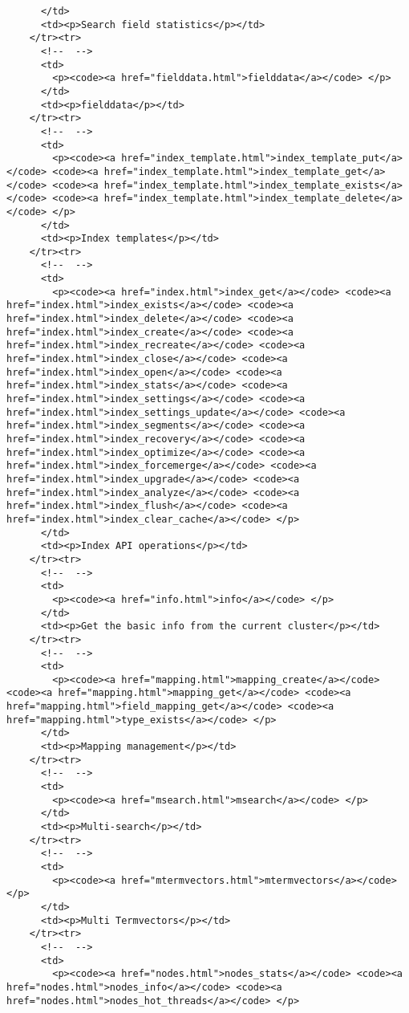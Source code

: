 \documentclass[]{article}
\begin{document}
\begin{verbatim}
      </td>
      <td><p>Search field statistics</p></td>
    </tr><tr>
      <!--  -->
      <td>
        <p><code><a href="fielddata.html">fielddata</a></code> </p>
      </td>
      <td><p>fielddata</p></td>
    </tr><tr>
      <!--  -->
      <td>
        <p><code><a href="index_template.html">index_template_put</a></code> <code><a href="index_template.html">index_template_get</a></code> <code><a href="index_template.html">index_template_exists</a></code> <code><a href="index_template.html">index_template_delete</a></code> </p>
      </td>
      <td><p>Index templates</p></td>
    </tr><tr>
      <!--  -->
      <td>
        <p><code><a href="index.html">index_get</a></code> <code><a href="index.html">index_exists</a></code> <code><a href="index.html">index_delete</a></code> <code><a href="index.html">index_create</a></code> <code><a href="index.html">index_recreate</a></code> <code><a href="index.html">index_close</a></code> <code><a href="index.html">index_open</a></code> <code><a href="index.html">index_stats</a></code> <code><a href="index.html">index_settings</a></code> <code><a href="index.html">index_settings_update</a></code> <code><a href="index.html">index_segments</a></code> <code><a href="index.html">index_recovery</a></code> <code><a href="index.html">index_optimize</a></code> <code><a href="index.html">index_forcemerge</a></code> <code><a href="index.html">index_upgrade</a></code> <code><a href="index.html">index_analyze</a></code> <code><a href="index.html">index_flush</a></code> <code><a href="index.html">index_clear_cache</a></code> </p>
      </td>
      <td><p>Index API operations</p></td>
    </tr><tr>
      <!--  -->
      <td>
        <p><code><a href="info.html">info</a></code> </p>
      </td>
      <td><p>Get the basic info from the current cluster</p></td>
    </tr><tr>
      <!--  -->
      <td>
        <p><code><a href="mapping.html">mapping_create</a></code> <code><a href="mapping.html">mapping_get</a></code> <code><a href="mapping.html">field_mapping_get</a></code> <code><a href="mapping.html">type_exists</a></code> </p>
      </td>
      <td><p>Mapping management</p></td>
    </tr><tr>
      <!--  -->
      <td>
        <p><code><a href="msearch.html">msearch</a></code> </p>
      </td>
      <td><p>Multi-search</p></td>
    </tr><tr>
      <!--  -->
      <td>
        <p><code><a href="mtermvectors.html">mtermvectors</a></code> </p>
      </td>
      <td><p>Multi Termvectors</p></td>
    </tr><tr>
      <!--  -->
      <td>
        <p><code><a href="nodes.html">nodes_stats</a></code> <code><a href="nodes.html">nodes_info</a></code> <code><a href="nodes.html">nodes_hot_threads</a></code> </p>

\end{verbatim}
\end{document}
